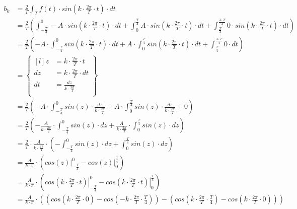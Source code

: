 \begin{equation}
\begin{aligned}
b_k&=\frac{2}{T}\int_{T}f(t) \cdot sin\left( k \cdot \frac{2\pi}{T} \cdot t\right) \cdot dt\\
&=\frac{2}{T} \left(\int_{-\frac{T}{4}}^{0}-A \cdot sin\left( k \cdot \frac{2\pi}{T} \cdot t\right) \cdot dt 
+ \int_{0}^{\frac{T}{4}} A \cdot sin\left( k \cdot \frac{2\pi}{T} \cdot t\right) \cdot dt 
+ \int_{\frac{T}{4}}^{\frac{3\cdot T}{4}} 0 \cdot sin\left( k \cdot \frac{2\pi}{T} \cdot t\right) \cdot dt \right)\\
&=\frac{2}{T} \left(-A \cdot \int_{-\frac{T}{4}}^{0} sin\left( k \cdot \frac{2\pi}{T} \cdot t\right) \cdot dt 
+  A \cdot \int_{0}^{\frac{T}{4}} sin\left( k \cdot \frac{2\pi}{T} \cdot t\right) \cdot dt 
+ \int_{\frac{T}{4}}^{\frac{3\cdot T}{4}} 0 \cdot dt \right)\\
&=\begin{Bmatrix*}[l]
z&=k \cdot \frac{2\pi}{T} \cdot t \\
dz&=k \cdot \frac{2\pi}{T} \cdot dt \\
dt&=\frac{dz}{k \cdot \frac{2\pi}{T}} \\
\end{Bmatrix*}\\
&=\frac{2}{T} \left(-A \cdot \int_{-\frac{T}{4}}^{0} sin\left( z \right) \cdot \frac{dz}{k \cdot \frac{2\pi}{T}}  
+  A \cdot \int_{0}^{\frac{T}{4}} sin\left( z \right) \cdot \frac{dz}{k \cdot \frac{2\pi}{T}}  
+ 0 \right)\\
&=\frac{2}{T} \left(-\frac{A}{k \cdot \frac{2\pi}{T}} \cdot \int_{-\frac{T}{4}}^{0} sin\left( z \right) \cdot dz  
+  \frac{A}{k \cdot \frac{2\pi}{T}} \cdot \int_{0}^{\frac{T}{4}} sin\left( z \right) \cdot dz \right)\\
&=\frac{2}{T} \cdot \frac{A}{k \cdot \frac{2\pi}{T}} \cdot \left(- \int_{-\frac{T}{4}}^{0} sin\left( z \right) \cdot dz  
+  \int_{0}^{\frac{T}{4}} sin\left( z \right) \cdot dz \right)\\
&=\frac{A}{k \cdot \pi} \cdot \left(\left. cos\left( z \right) \right|_{-\frac{T}{4}}^{0} - \left. cos\left( z \right) \right|_{0}^{\frac{T}{4}} \right)\\
&=\frac{A}{k \cdot \pi} \cdot \left(\left. cos\left( k \cdot \frac{2\pi}{T} \cdot t \right) \right|_{-\frac{T}{4}}^{0} - \left. cos\left( k \cdot \frac{2\pi}{T} \cdot t \right) \right|_{0}^{\frac{T}{4}} \right)\\
&=\frac{A}{k \cdot \pi} \cdot \left(\left( cos\left( k \cdot \frac{2\pi}{T} \cdot 0 \right) - cos\left(- k \cdot \frac{2\pi}{T} \cdot \frac{T}{4} \right) \right) - \left( cos\left( k \cdot \frac{2\pi}{T} \cdot \frac{T}{4} \right) - cos\left( k \cdot \frac{2\pi}{T} \cdot 0 \right) \right) \right)\\

\end{aligned}
\end{equation}
